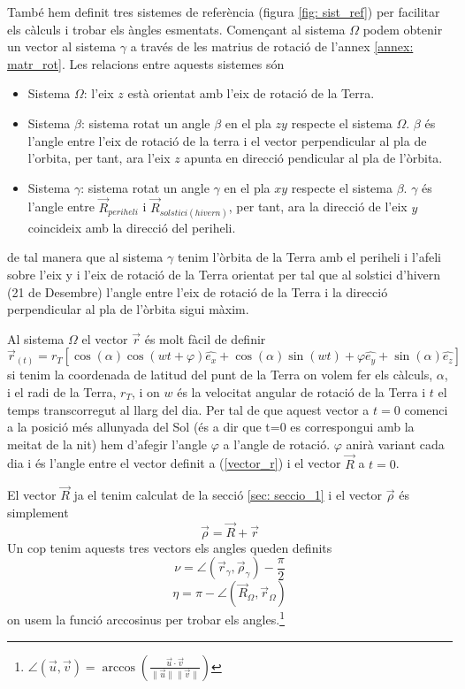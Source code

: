 \documentclass[11pt]{article}
\begin{document}
També hem definit tres sistemes de referència (figura \ref{fig: sist_ref}) per facilitar els càlculs i trobar els àngles esmentats. Començant al sistema $\Omega$ podem obtenir un vector al sistema $\gamma$ a través de les matrius de rotació de l'annex \ref{annex: matr_rot}. Les relacions entre aquests sistemes són
\begin{itemize}
    \item Sistema $\Omega$: l'eix $z$ està orientat amb l'eix de rotació de la Terra.
    \item Sistema $\beta$: sistema rotat un angle $\beta$ en el pla $zy$ respecte el sistema $\Omega$. $\beta$ és l'angle entre l'eix de rotació de la terra i el vector perpendicular al pla de l'orbita, per tant, ara l'eix $z$ apunta en direcció pendicular al pla de l'òrbita.
    \item Sistema $\gamma$: sistema rotat un angle $\gamma$ en el pla $xy$ respecte el sistema $\beta$. $\gamma$ és l'angle entre $\vec{R}_{periheli}$ i $\vec{R}_{solstici(hivern)}$, per tant, ara la direcció de l'eix $y$ coincideix amb la direcció del periheli.
\end{itemize}
de tal manera que al sistema $\gamma$ tenim l'òrbita de la Terra amb el periheli i l'afeli sobre l'eix y i l'eix de rotació de la Terra orientat per tal que al solstici d'hivern (21 de Desembre) l'angle entre l'eix de rotació de la Terra i la direcció perpendicular al pla de l'òrbita sigui màxim.

Al sistema $\Omega$ el vector $\vec{r}$ és molt fàcil de definir 
\begin{equation}
    \vec{r}_{(t)}=r_T[\cos(\alpha)\cos(wt+\varphi)\hat{e_x}+\cos(\alpha)\sin(wt)+\varphi\hat{e_y}+\sin(\alpha)\hat{e_z}]
    \label{vector_r}
\end{equation}
si tenim la coordenada de latitud del punt de la Terra on volem fer els càlculs, $\alpha$, i el radi de la Terra, $r_T$, i on $w$ és la velocitat angular de rotació de la Terra i $t$ el temps transcorregut al llarg del dia.
Per tal de que aquest vector a $t=0$ comenci a la posició més allunyada del Sol (és a dir que t=0 es correspongui amb la meitat de la nit) hem d'afegir l'angle $\varphi$ a l'angle de rotació. $\varphi$ anirà variant cada dia i és l'angle entre el vector definit a (\ref{vector_r}) i el vector $\vec{R}$ a $t=0$.

El vector $\vec{R}$ ja el tenim calculat de la secció \ref{sec: seccio_1} i el vector $\vec{\rho}$ és simplement
\begin{equation}
    \vec{\rho}= \vec{R}+\vec{r}
\end{equation}
Un cop tenim aquests tres vectors els angles queden definits
\begin{equation}
    \nu=\angle (\vec{r}_{\gamma}, \vec{\rho}_{\gamma}) -\frac{\pi}{2}  
\end{equation}
\begin{equation}
    \eta=\pi - \angle (\vec{R}_{\Omega}, \vec{r}_{\Omega})
\end{equation}
on usem la funció arccosinus per trobar els angles.\footnote{$\angle (\vec{u}, \vec{v})= \arccos\left(\frac{\vec{u} \cdot \vec{v}}{\|\vec{u}\| \|\vec{v}\|}\right)$}
\end{document}
